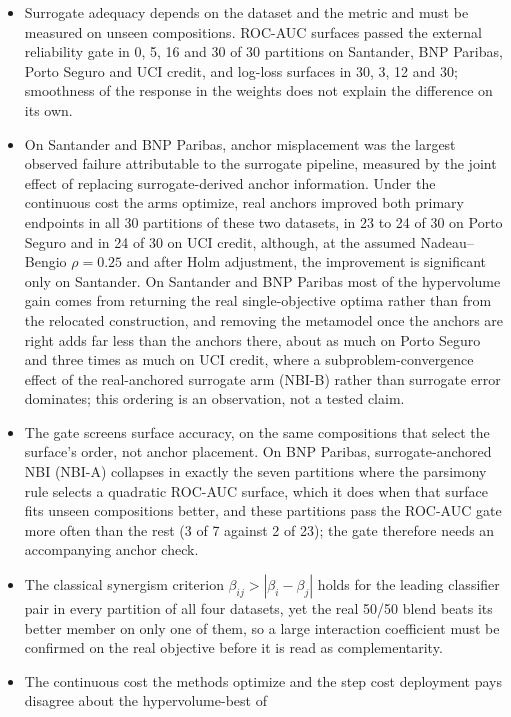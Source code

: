 \begin{itemize}
\item Surrogate adequacy depends on the dataset and the metric and must be measured on unseen compositions. ROC-AUC
surfaces passed the external reliability gate in 0, 5, 16 and 30 of 30 partitions on Santander, BNP Paribas, Porto
Seguro and UCI credit, and log-loss surfaces in 30, 3, 12 and 30; smoothness of the response in the weights does not
explain the difference on its own.
\item On Santander and BNP Paribas, anchor misplacement was the largest observed failure attributable to the
surrogate pipeline, measured by the joint effect of replacing surrogate-derived anchor information. Under the continuous cost the arms optimize, real anchors improved both primary endpoints in
all 30 partitions of these two datasets, in 23 to 24 of 30 on Porto Seguro and in 24 of 30 on UCI credit, although,
at the assumed Nadeau--Bengio $\rho = 0.25$ and after Holm adjustment, the improvement is significant only on Santander. On
Santander and BNP Paribas most of the hypervolume gain comes from returning the real single-objective optima rather
than from the relocated construction, and removing the metamodel once the anchors are right adds far less than the
anchors there, about as much on Porto Seguro and three times as much on UCI credit, where a subproblem-convergence
effect of the real-anchored surrogate arm (NBI-B) rather than surrogate error dominates; this ordering is an
observation, not a tested claim.
\item The gate screens surface accuracy, on the same compositions that select the surface's order, not anchor
placement. On BNP Paribas, surrogate-anchored NBI (NBI-A)
collapses in exactly the seven partitions where the parsimony rule selects a quadratic ROC-AUC surface, which it does
when that surface fits unseen compositions better, and these partitions pass the ROC-AUC gate more often than the rest
(3 of 7 against 2 of 23); the gate therefore needs an accompanying anchor check.
\item The classical synergism criterion $\beta_{ij} > |\beta_i - \beta_j|$ holds for the leading classifier pair in
every partition of all four datasets, yet the real 50/50 blend beats its better member on only one of them, so a large
interaction coefficient must be confirmed on the real objective before it is read as complementarity.
\item The continuous cost the methods optimize and the step cost deployment pays disagree about the hypervolume-best of

\end{itemize}
